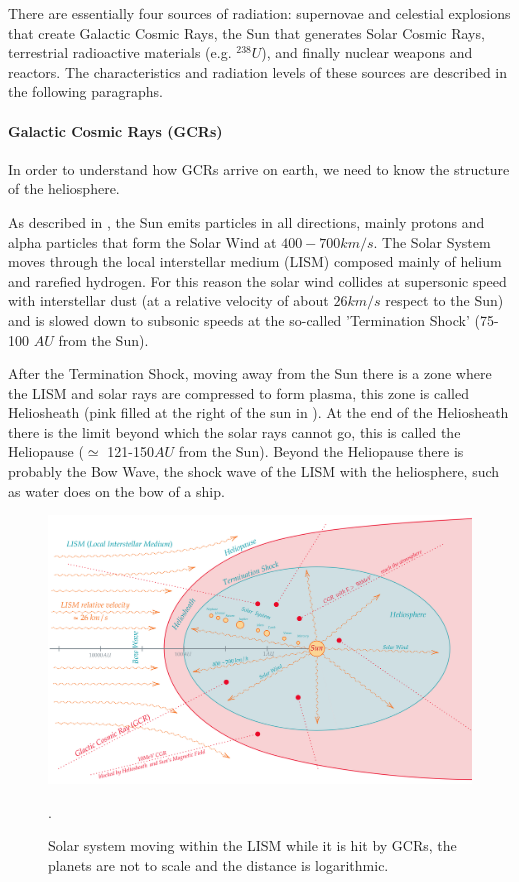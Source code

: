 {{{{				There are essentially four sources of radiation: supernovae and celestial explosions that create Galactic Cosmic Rays, the Sun that generates Solar Cosmic Rays, terrestrial radioactive materials (e.g. $^{238}U$), and finally nuclear weapons and reactors. The characteristics and radiation levels of these sources are described in the following paragraphs.
				
				
				\paragraph{Galactic Cosmic Rays (GCRs)}{
						In order to understand how GCRs arrive on earth, we need to know the structure of the heliosphere. 
						
						
						As described in , the Sun emits particles in all directions, mainly protons and alpha particles that form the Solar Wind at $400-700km/s$. 
						The Solar System moves through the local interstellar medium (LISM) composed mainly of helium and rarefied hydrogen. 
						For this reason the solar wind collides at supersonic speed with interstellar dust (at a relative velocity of about $26km/s$ respect to the Sun) and is slowed down to subsonic speeds at the so-called 'Termination Shock' (75-100 $AU$ from the Sun). 
						
						After the Termination Shock, moving away from the Sun there is a zone where the LISM and solar rays are compressed to form plasma, this zone is called Heliosheath (pink filled at the right of the sun in ). At the end of the Heliosheath there is the limit beyond which the solar rays cannot go, this is called the Heliopause ($\simeq$ 121-150$AU$ from the Sun). Beyond the Heliopause there is probably the Bow Wave, the shock wave of the LISM with the heliosphere, such as water does on the bow of a ship.\\
						
						
						\begin{figure}[H]
							\centering
							\includegraphics[scale=0.16,center]{./images/SolarSystem_GCRs.png}
							\caption{Solar system moving within the LISM while it is hit by GCRs, the planets are not to scale and the distance is logarithmic.}.
							\label{fig:SolarSystemGCRs}
						\end{figure} 
					
}}}}}
